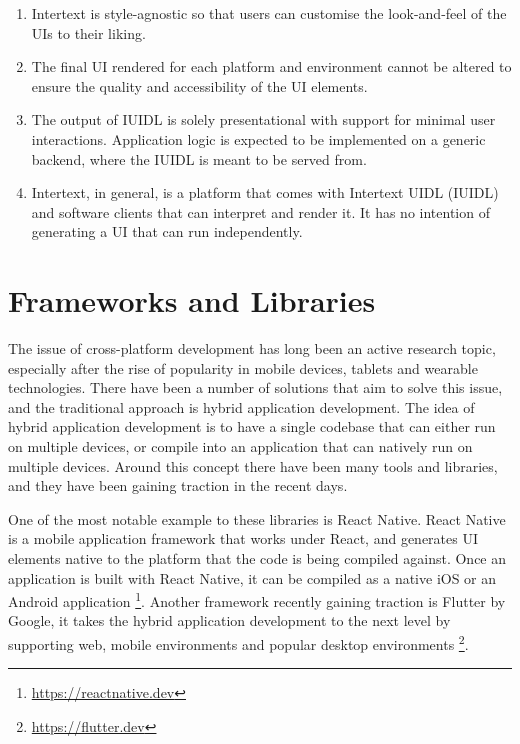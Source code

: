 \begin{enumerate}
  \item Intertext is style-agnostic so that users can customise the look-and-feel of the UIs to their liking.
  
  \item The final UI rendered for each platform and environment cannot be altered to ensure the quality and accessibility of the UI elements.
  
  \item The output of IUIDL is solely presentational with support for minimal user interactions. Application logic is expected to be implemented on a generic backend, where the IUIDL is meant to be served from.

  \item Intertext, in general, is a platform that comes with Intertext UIDL (IUIDL) and software clients that can interpret and render it. It has no intention of generating a UI that can run independently.
\end{enumerate}

\section{Frameworks and Libraries} \label{relatedTools}

The issue of cross-platform development has long been an active research topic, especially after the rise of popularity in mobile devices, tablets and wearable technologies. There have been a number of solutions that aim to solve this issue, and the traditional approach is hybrid application development. The idea of hybrid application development is to have a single codebase that can either run on multiple devices, or compile into an application that can natively run on multiple devices. Around this concept there have been many tools and libraries, and they have been gaining traction in the recent days.

One of the most notable example to these libraries is React Native. React Native is a mobile application framework that works under React, and generates UI elements native to the platform that the code is being compiled against. Once an application is built with React Native, it can be compiled as a native iOS or an Android application \footnote{\url{https://reactnative.dev}}. Another framework recently gaining traction is Flutter by Google, it takes the hybrid application development to the next level by supporting web, mobile environments and popular desktop environments \footnote{\url{https://flutter.dev}}.


